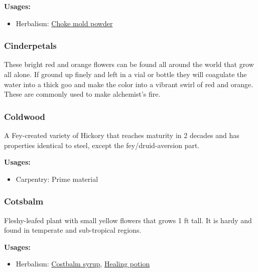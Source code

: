 \textbf{Usages:}

\begin{itemize}[noitemsep]
\item[] Herbalism: \hyperref[Choke mold powder]{Choke mold powder}
\end{itemize}

\subsubsection{Cinderpetals}
\label{Cinderpetals}

These bright red and orange flowers can be found all around the world that grow all alone. If ground up finely and left in a vial or bottle they will coagulate the water into a thick goo and make the color into a vibrant swirl of red and orange. These are commonly used to make alchemist's fire.

\subsubsection{Coldwood}
\label{Coldwood}

A Fey-created variety of Hickory that reaches maturity in 2 decades and has properties identical to steel, except the fey/druid-aversion part.

\vspace{5mm}

\textbf{Usages:}

\begin{itemize}[noitemsep]
\item[] Carpentry: Prime material
\end{itemize}

\subsubsection{Cotsbalm}
\label{Cotsbalm}

Fleshy-leafed plant with small yellow flowers that grows 1 ft tall. It is hardy and found in temperate and sub-tropical regions.

\vspace{5mm}

\textbf{Usages:}

\begin{itemize}[noitemsep]
\item[] Herbalism: \hyperref[Costbalm syrup]{Costbalm syrup}, \hyperref[healing_potion]{Healing potion}
\end{itemize}

